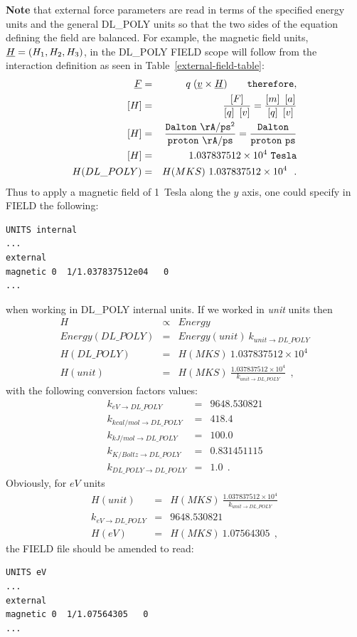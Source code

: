 {\bf Note} that external force parameters are read in terms of
the specified energy units and the general DL\_POLY units so
that the two sides of the equation defining the field are balanced.
For example, the magnetic field units, $\mbox{$\underline{H}$} = (H_{1},H_{2},H_{3})$,
in the DL\_POLY FIELD scope will follow from the interaction definition
as seen in Table~\ref{external-field-table}:
\begin{eqnarray}
\vek{F} &=& q \; (\vek{v} \times \vek{H})~~~~~~{\tt therefore}, \nonumber \\
\left[H\right] &=& \frac{\left[F\right]}{\left[q\right]~\left[v\right]} = \frac{\left[m\right]~\left[a\right]}{\left[q\right]~\left[v\right]} \nonumber \\
\left[H\right] &=& \frac{\tt Dalton~\AA/ps^{2}}{\tt proton~\AA/ps} = \frac{\tt Dalton}{\tt proton~ps} \\ \label{external-field-units}
\left[H\right] &=& 1.037837512 \times 10^{4}~{\tt Tesla} \\
H(DL\_POLY) &=& H(MKS)~1.037837512 \times 10^{4}~~. \nonumber
\end{eqnarray}
Thus to apply a magnetic field of 1~Tesla along the $y$ axis,
one could specify in FIELD the following:
\begin{lstlisting}
UNITS internal
...
external
magnetic 0  1/1.037837512e04   0
...
\end{lstlisting}
when working in DL\_POLY internal units.  If we worked in {\em unit}
units then
\begin{eqnarray}
H &\propto& Energy \nonumber \\
Energy(DL\_POLY) &=& Energy(unit) ~ k_{unit \to DL\_POLY} \nonumber \\
H(DL\_POLY) &=& H(MKS)~1.037837512 \times 10^{4} \\
H(unit) &=& H(MKS)~\frac{1.037837512 \times 10^{4}}{k_{unit \to DL\_POLY}}~~, \nonumber
\end{eqnarray}
with the following conversion factors values:
\begin{eqnarray}
k_{eV \to DL\_POLY} &=& 9648.530821 \nonumber \\
k_{kcal/mol \to DL\_POLY} &=& 418.4 \nonumber \\
k_{kJ/mol \to DL\_POLY} &=& 100.0 \\
k_{K/Boltz \to DL\_POLY} &=& 0.831451115 \nonumber \\
k_{DL\_POLY \to DL\_POLY} &=& 1.0~~. \nonumber
\end{eqnarray}
Obviously, for $eV$ units
\begin{eqnarray}
H(unit) &=& H(MKS)~\frac{1.037837512 \times 10^{4}}{k_{unit \to DL\_POLY}} \nonumber \\
k_{eV \to DL\_POLY} &=& 9648.530821 \\
H(eV) &=& H(MKS)~1.07564305~~, \nonumber
\end{eqnarray}
the FIELD file should be amended to read:
\begin{lstlisting}
UNITS eV
...
external
magnetic 0  1/1.07564305   0
...
\end{lstlisting}


